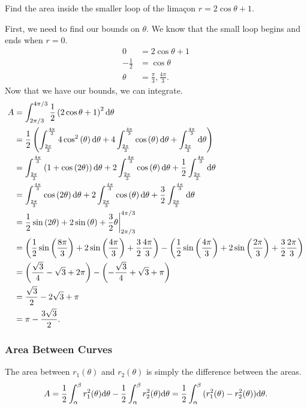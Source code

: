 \begin{example}
	Find the area inside the smaller loop of the lima\c{c}on $r=2\cos{\theta}+1$.
\end{example}
First, we need to find our bounds on $\theta$.
We know that the small loop begins and ends when $r=0$.
\begin{align*}
	0 &= 2\cos{\theta}+1 \\
	-\frac{1}{2} &= \cos{\theta} \\
	\theta &= \frac{\pi}{3}, \frac{4\pi}{3}.
\end{align*}
\indent
Now that we have our bounds, we can integrate.
\begin{align*}
	A &= \int_{2\pi/3}^{4\pi/3}{\frac{1}{2}\left(2\cos{\theta}+1\right)^2\mathrm{d} \theta} \\
	&= \frac{1}{2}\left(\int_{\frac{2\pi}{3}}^{\frac{4\pi}{3}}4\cos^{2}\left(\theta\right)\mathrm{d} \theta+4\int_{\frac{2\pi}{3}}^{\frac{4\pi}{3}}\cos\left(\theta\right)\mathrm{d} \theta+\int_{\frac{2\pi}{3}}^{\frac{4\pi}{3}}\mathrm{d} \theta\right) \\
	&= \int_{\frac{2\pi}{3}}^{\frac{4\pi}{3}}\left(1+\cos\left(2\theta\right)\right)\mathrm{d} \theta+2\int_{\frac{2\pi}{3}}^{\frac{4\pi}{3}}\cos\left(\theta\right)\mathrm{d} \theta+\frac{1}{2}\int_{\frac{2\pi}{3}}^{\frac{4\pi}{3}}\mathrm{d} \theta \\
	&= \int_{\frac{2\pi}{3}}^{\frac{4\pi}{3}}\cos\left(2\theta\right)\mathrm{d} \theta+2\int_{\frac{2\pi}{3}}^{\frac{4\pi}{3}}\cos\left(\theta\right)\mathrm{d} \theta+\frac{3}{2}\int_{\frac{2\pi}{3}}^{\frac{4\pi}{3}}\mathrm{d} \theta \\
	&= \frac{1}{2}\sin\left(2\theta\right)+2\sin\left(\theta\right)+\frac{3}{2}\theta \biggr\rvert_{2\pi/3}^{4\pi/3} \\
	&= \left(\frac{1}{2}\sin\left(\frac{8\pi}{3}\right)+2\sin\left(\frac{4\pi}{3}\right)+\frac{3}{2}\frac{4\pi}{3}\right)-\left(\frac{1}{2}\sin\left(\frac{4\pi}{3}\right)+2\sin\left(\frac{2\pi}{3}\right)+\frac{3}{2}\frac{2\pi}{3}\right) \\
	&= \left(\frac{\sqrt{3}}{4}-\sqrt{3}+2\pi\right)-\left(-\frac{\sqrt{3}}{4}+\sqrt{3}+\pi\right) \\
	&= \frac{\sqrt{3}}{2}-2\sqrt{3}+\pi \\
	&= \pi-\frac{3\sqrt{3}}{2}.
\end{align*}

\subsubsection{Area Between Curves}
The area between $r_1(\theta)$ and $r_2(\theta)$ is simply the difference between the areas.
\begin{equation*}
	A = \frac{1}{2}\int_{\alpha}^{\beta}{r_1^2(\theta)\mathrm{d} \theta} - \frac{1}{2}\int_{\alpha}^{\beta}{r_2^2(\theta)\mathrm{d} \theta} = \frac{1}{2}\int_{\alpha}^{\beta}{(r_1^2(\theta)-r_2^2(\theta))\mathrm{d} \theta}.
\end{equation*}

